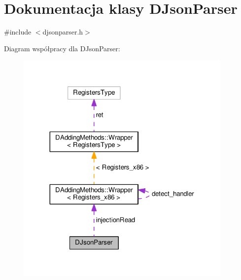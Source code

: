 \hypertarget{class_d_json_parser}{\section{Dokumentacja klasy D\-Json\-Parser}
\label{class_d_json_parser}
}


{\ttfamily \#include $<$djsonparser.\-h$>$}



Diagram współpracy dla D\-Json\-Parser\-:
\nopagebreak
\begin{figure}[H]
\begin{center}
\leavevmode
\includegraphics[width=299pt]{class_d_json_parser__coll__graph}
\end{center}
\end{figure}
